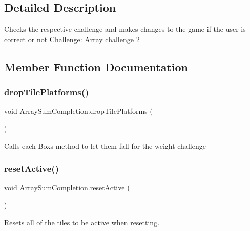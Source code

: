 \subsection{Detailed Description}
Checks the respective challenge and makes changes to the game if the user is correct or not Challenge\+: Array challenge 2 

\subsection{Member Function Documentation}
\mbox{\label{class_array_sum_completion_ac1c819eeab2598e8c2c2e1e78e15a666}} 
\subsubsection{\texorpdfstring{drop\+Tile\+Platforms()}{dropTilePlatforms()}}
{\footnotesize\ttfamily void Array\+Sum\+Completion.\+drop\+Tile\+Platforms (\begin{DoxyParamCaption}{ }\end{DoxyParamCaption})}

Calls each Box\textquotesingle{}s method to let them fall for the weight challenge \mbox{\label{class_array_sum_completion_a9c8cbe4d07015cd0e6c958e39e0e92d2}} 
\subsubsection{\texorpdfstring{reset\+Active()}{resetActive()}}
{\footnotesize\ttfamily void Array\+Sum\+Completion.\+reset\+Active (\begin{DoxyParamCaption}{ }\end{DoxyParamCaption})}



Resets all of the tiles to be active when resetting. 

\mbox{\label{class_array_sum_completion_a1289c469259345582c0227f7a617a19f}} 
